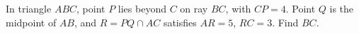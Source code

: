 In triangle $ABC$, point $P$ lies beyond $C$ on ray $BC$, with $CP=4$. Point $Q$ is the midpoint of $AB$, and $R=PQ\cap AC$ satisfies $AR=5$, $RC=3$. Find $BC$.
